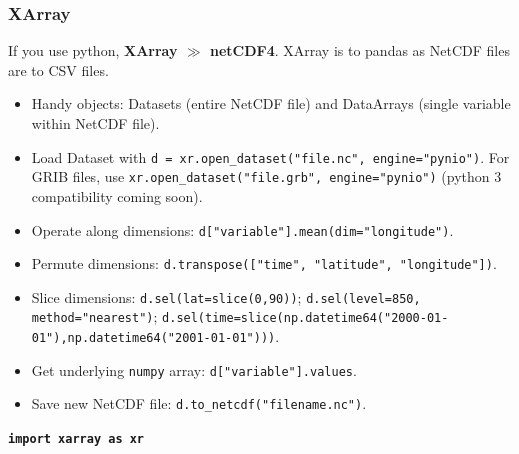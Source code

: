 \documentclass[aspectratio=169]{beamer}
\begin{document}
\begin{frame}
  \frametitle{XArray}
  If you use python, \textbf{XArray $\mathbf{\gg}$ netCDF4}. XArray is to pandas as NetCDF files are to CSV files.
  \begin{itemize}
    \pause
    \item Handy objects: Datasets (entire NetCDF file) and DataArrays (single variable within NetCDF file).
    \pause
    \item Load Dataset with \texttt{d = xr.open\_dataset("file.nc", engine="pynio")}. For GRIB files, use \texttt{xr.open\_dataset("file.grb", engine="pynio")} ({\color{red}python 3 compatibility coming soon}).
    \pause
    \item Operate along dimensions: \texttt{d["variable"].mean(dim="longitude")}.
    \pause
    \item Permute dimensions: \texttt{d.transpose(["time", "latitude", "longitude"])}.
    \pause
    \item Slice dimensions: \texttt{d.sel(lat=slice(0,90))}; \texttt{d.sel(level=850, method="nearest")}; 
    \pause
    \texttt{d.sel(time=slice(np.datetime64("2000-01-01"),np.datetime64("2001-01-01")))}.
    \item Get underlying \texttt{numpy} array: \texttt{d["variable"].values}.
    \pause
    \item Save new NetCDF file: \texttt{d.to\_netcdf("filename.nc")}.
  \end{itemize}
    \pause
    \begin{center}
      \textbf{{\color{red}\texttt{import xarray as xr}}}
    \end{center}
\end{frame}
\end{document}
